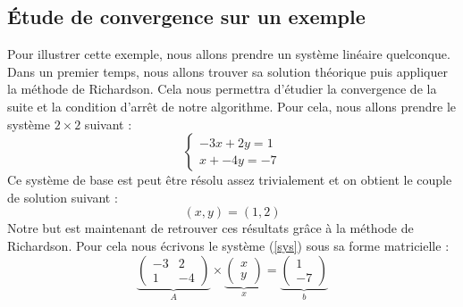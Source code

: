 \subsection{Étude de convergence sur un exemple}
Pour illustrer cette exemple, nous allons prendre un système linéaire quelconque. Dans un premier temps, nous allons trouver sa solution théorique puis appliquer la méthode de Richardson. Cela nous permettra d'étudier la convergence de la suite et la condition d'arrêt de notre algorithme. Pour cela, nous allons prendre le système $2\times 2$ suivant : 
\begin{equation}
\begin{cases}
-3x + 2y = 1\\
x + -4y = -7
\end{cases}
\label{sys}
\end{equation}
Ce système de base est peut être résolu assez trivialement et on obtient le couple de solution suivant : \begin{equation}
(x, y) = (1, 2)
\end{equation}
Notre but est maintenant de retrouver ces résultats grâce à la méthode de Richardson. Pour cela nous écrivons le système (\ref{sys}) sous sa forme matricielle : 
\begin{equation}
\underbrace{\begin{pmatrix}
	-3 & 2 \\
	1 & -4
	\end{pmatrix}}_{A} 
\times 
\underbrace{\begin{pmatrix}
	x \\ y
	\end{pmatrix} }_{x} 
=
\underbrace{\begin{pmatrix}
	1 \\ -7
	\end{pmatrix}}_{b}  
\end{equation}

